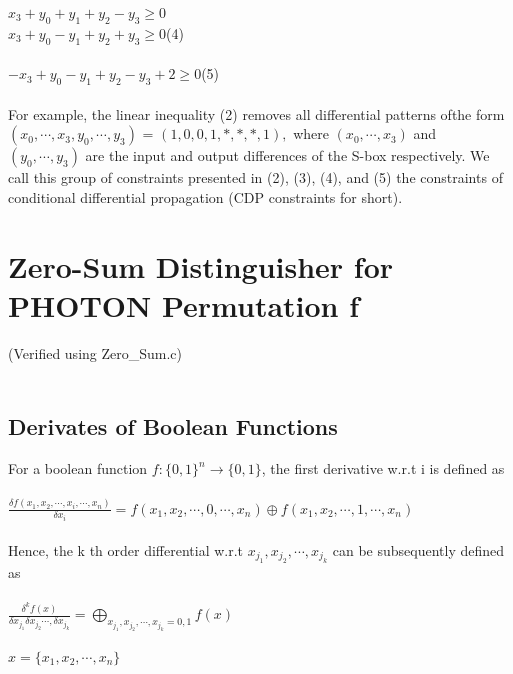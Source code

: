 \documentclass{article}
\begin{document}
$x_3+y_0+y_1+y_2-y_3 \ge 0$\\
$x_3+y_0-y_1+y_2+y_3 \ge 0$\hspace{8.4cm}(4)\\\\
$-x_3+y_0-y_1+y_2-y_3+2 \ge 0$\hspace{7.6cm}(5)\\\\
For example, the linear inequality (2) removes all differential patterns ofthe form $(x_0,\cdots,x_3,y_0,\cdots,y_3)$ = $(1,0,0,1,*,*,*,1),$ where $(x_0,\cdots,x_3)$ and $(y_0,\cdots,y_3)$ are the input and output differences of the S-box respectively. We call this group of constraints presented in (2), (3), (4), and (5) the constraints of conditional differential propagation (CDP constraints for short).
\newpage
\section{Zero-Sum Distinguisher for PHOTON Permutation f}
(Verified using Zero\_Sum.c)\\\\
\subsection{Derivates of Boolean Functions}
For a boolean function $f:\{0, 1\}^n \rightarrow \{0, 1\}$, the first derivative w.r.t i is defined as\\\\
$\frac{\delta f(x_1,x_2,\cdots,x_i,\cdots,x_n)}{\delta x_i} = f(x_1,x_2,\cdots,0,\cdots,x_n) \oplus f(x_1,x_2,\cdots,1,\cdots,x_n)$\\\\
Hence, the k th order differential w.r.t $x_{j_1},x_{j_2},\cdots,x_{j_k}$ can be subsequently defined as\\\\
$\frac{\delta^kf(x)}{\delta x_{j_1} \delta x_{j_2}\cdots,\delta x_{j_k}} = \bigoplus \limits_{x_{j_1},x_{j_2},\cdots,x_{j_k}=0,1}f(x)$\\\\
$x = \{x_1,x_2,\cdots,x_n\}$\\\\
\end{document}
